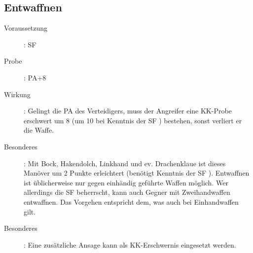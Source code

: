 \subsection{Entwaffnen}
\label{reaktion.entwaffnen}
\begin{description}
    \item[Voraussetzung]:
        SF 
    \item[Probe]:
        PA+8
    \item[Wirkung]:
        Gelingt die PA des Verteidigers, muss der Angreifer eine KK-Probe erschwert um 8 (um 10 bei Kenntnis der SF ) bestehen, sonst verliert er die Waffe.
    \item[Besonderes]:
        Mit Bock, Hakendolch, Linkhand und ev. Drachenklaue ist dieses Manöver um 2 Punkte erleichtert (benötigt Kenntnis der SF ).
        Entwaffnen ist üblicherweise nur gegen einhändig geführte Waffen möglich.
        Wer allerdings die SF  beherrscht, kann auch Gegner mit Zweihandwaffen entwaffnen.
        Das Vorgehen entspricht dem, was auch bei Einhandwaffen gilt.
    \item[Besonderes]:
        Eine zusätzliche Ansage kann als KK-Erschwernis eingesetzt werden.
\end{description}
